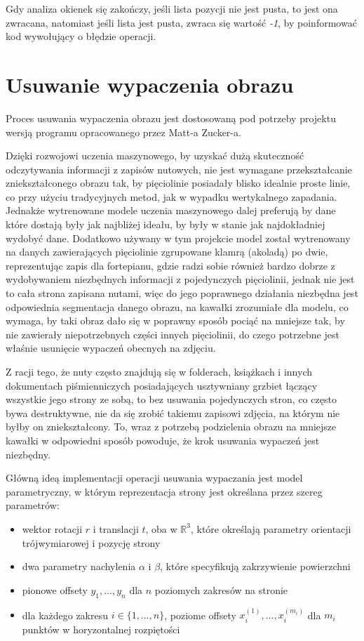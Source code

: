 Gdy analiza okienek się zakończy, jeśli lista pozycji nie jest pusta, to jest ona zwracana, natomiast jeśli lista jest pusta, zwraca się wartość \textit{-1}, by poinformować kod wywołujący o błędzie operacji.

\section{Usuwanie wypaczenia obrazu}

Proces usuwania wypaczenia obrazu jest dostosowaną pod potrzeby projektu wersją programu opracowanego przez Matt-a Zucker-a.

Dzięki rozwojowi uczenia maszynowego, by uzyskać dużą skuteczność odczytywania informacji z zapisów nutowych, nie jest wymagane przekształcanie zniekształconego obrazu tak, by pięciolinie posiadały blisko idealnie proste linie, co przy użyciu tradycyjnych metod, jak w wypadku wertykalnego zapadania. Jednakże wytrenowane modele uczenia maszynowego dalej preferują by dane które dostają były jak najbliżej ideału, by były w stanie jak najdokładniej wydobyć dane. Dodatkowo używany w tym projekcie model został wytrenowany na danych zawierających pięciolinie zgrupowane klamrą (akoladą) po dwie, reprezentując zapis dla fortepianu, gdzie radzi sobie również bardzo dobrze z wydobywaniem niezbędnych informacji z pojedynczych pięciolinii, jednak nie jest to cała strona zapisana nutami, więc do jego poprawnego działania niezbędna jest odpowiednia segmentacja danego obrazu, na kawałki zrozumiałe dla modelu, co wymaga, by taki obraz dało się w poprawny sposób pociąć na mniejsze tak, by nie zawierały niepotrzebnych części innych pięciolinii, do czego potrzebne jest właśnie usunięcie wypaczeń obecnych na zdjęciu.

Z racji tego, że nuty często znajdują się w folderach, książkach i innych dokumentach piśmienniczych posiadających usztywniany grzbiet łączący wszystkie jego strony ze sobą, to bez usuwania pojedynczych stron, co często bywa destruktywne, nie da się zrobić takiemu zapisowi zdjęcia, na którym nie byłby on zniekształcony. To, wraz z potrzebą podzielenia obrazu na mniejsze kawałki w odpowiedni sposób powoduje, że krok usuwania wypaczeń jest niezbędny.

Główną ideą implementacji operacji usuwania wypaczania jest model parametryczny, w którym reprezentacja strony jest określana przez szereg parametrów:

\begin{itemize}
	\item wektor rotacji $r$ i translacji $t$, oba w $\mathbb{R}^{3}$, które określają parametry orientacji trójwymiarowej i pozycję strony
	\item dwa parametry nachylenia $\alpha$ i $\beta$, które specyfikują zakrzywienie powierzchni
	\item pionowe offsety $y_{1},\ldots,y_{n}$ dla $n$ poziomych zakresów na stronie
	\item dla każdego zakresu $i \in \{1,\ldots,n\}$, poziome offsety $x_{i}^{(1)},\ldots,x_{i}^{(m_{i})}$ dla $m_{i}$ punktów w horyzontalnej rozpiętości
\end{itemize} 

